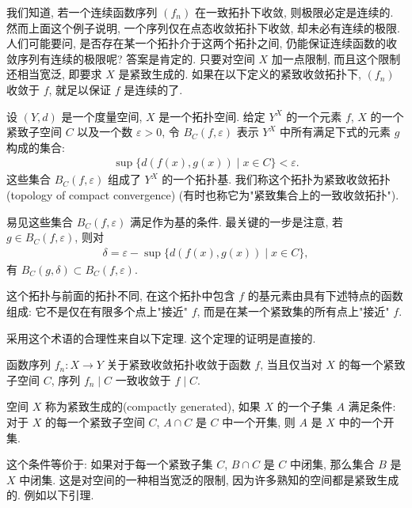 \documentclass[../../main.tex]{subfiles}
\begin{document}
我们知道, 若一个连续函数序列 $(f_n)$ 在一致拓扑下收敛, 则极限必定是连续的. 然而上面这个例子说明, 一个序列仅在点态收敛拓扑下收敛, 却未必有连续的极限. 人们可能要问, 是否存在某一个拓扑介于这两个拓扑之间, 仍能保证连续函数的收敛序列有连续的极限呢? 答案是肯定的. 只要对空间 $X$ 加一点限制, 而且这个限制还相当宽泛, 即要求 $X$ 是紧致生成的. 如果在以下定义的紧致收敛拓扑下, $(f_n)$ 收敛于 $f$, 就足以保证 $f$ 是连续的了.

\begin{definition}\label{definition:ch07-compact-convergence}
设 $(Y,d)$ 是一个度量空间, $X$ 是一个拓扑空间. 给定 $Y^X$ 的一个元素 $f$, $X$ 的一个紧致子空间 $C$ 以及一个数 $\varepsilon>0$, 令 $B_C(f,\varepsilon)$ 表示 $Y^X$ 中所有满足下式的元素 $g$ 构成的集合:
\begin{align*}
\sup\{d(f(x),g(x))\mid x\in C\}<\varepsilon.
\end{align*}
这些集合 $B_C(f,\varepsilon)$ 组成了 $Y^X$ 的一个拓扑基. 我们称这个拓扑为紧致收敛拓扑(topology of compact convergence) (有时也称它为"紧致集合上的一致收敛拓扑").
\end{definition}

易见这些集合 $B_C(f,\varepsilon)$ 满足作为基的条件. 最关键的一步是注意, 若 $g\in B_C(f,\varepsilon)$, 则对
\begin{align*}
\delta=\varepsilon-\sup\{d(f(x),g(x))\mid x\in C\},
\end{align*}
有 $B_C(g,\delta)\subset B_C(f,\varepsilon)$.

这个拓扑与前面的拓扑不同, 在这个拓扑中包含 $f$ 的基元素由具有下述特点的函数组成: 它不是仅在有限多个点上"接近" $f$, 而是在某一个紧致集的所有点上"接近" $f$.

采用这个术语的合理性来自以下定理. 这个定理的证明是直接的.

\begin{theorem}\label{theorem:ch07-compact-convergence-char}
函数序列 $f_n\colon X\to Y$ 关于紧致收敛拓扑收敛于函数 $f$, 当且仅当对 $X$ 的每一个紧致子空间 $C$, 序列 $f_n\mid C$ 一致收敛于 $f\mid C$.
\end{theorem}

\begin{definition}\label{definition:ch07-compactly-generated}
空间 $X$ 称为紧致生成的(compactly generated), 如果 $X$ 的一个子集 $A$ 满足条件: 对于 $X$ 的每一个紧致子空间 $C$, $A\cap C$ 是 $C$ 中一个开集, 则 $A$ 是 $X$ 中的一个开集.
\end{definition}

这个条件等价于: 如果对于每一个紧致子集 $C$, $B\cap C$ 是 $C$ 中闭集, 那么集合 $B$ 是 $X$ 中闭集. 这是对空间的一种相当宽泛的限制, 因为许多熟知的空间都是紧致生成的. 例如以下引理.
\end{document}
